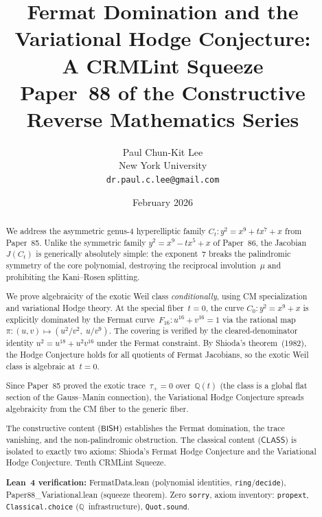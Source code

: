 \documentclass[11pt]{article}
\theoremstyle{plain}
\theoremstyle{definition}
\theoremstyle{remark}
\newcommand{\Q}{\mathbb{Q}}
\newcommand{\BISH}{\ensuremath{\mathsf{BISH}}}
\newcommand{\CLASS}{\ensuremath{\mathsf{CLASS}}}
\begin{document}
\title{%
  Fermat Domination and the Variational Hodge Conjecture:\\
  A CRMLint Squeeze\\[4pt]
  \large Paper~88 of the Constructive Reverse Mathematics Series}
\author{%
  Paul Chun-Kit Lee\\
  New York University\\
  \texttt{dr.paul.c.lee@gmail.com}}
\date{February 2026}
\maketitle

\begin{abstract}
We address the asymmetric genus-4 hyperelliptic family
$C_t\colon y^2 = x^9 + tx^7 + x$ from Paper~85.
Unlike the symmetric family $y^2 = x^9 - tx^5 + x$ of Paper~86,
the Jacobian~$J(C_t)$ is generically absolutely simple:
the exponent~$7$ breaks the palindromic symmetry of the core
polynomial, destroying the reciprocal involution~$\mu$ and
prohibiting the Kani--Rosen splitting.

We prove algebraicity of the exotic Weil class \emph{conditionally},
using CM specialization and variational Hodge theory.
At the special fiber~$t=0$, the curve
$C_0\colon y^2 = x^9 + x$ is explicitly dominated by the Fermat
curve~$F_{16}\colon u^{16} + v^{16} = 1$
via the rational map~$\pi\colon (u,v) \mapsto (u^2/v^2,\; u/v^9)$.
The covering is verified by the cleared-denominator identity
$u^2 = u^{18} + u^2 v^{16}$ under the Fermat constraint.
By Shioda's theorem~(1982), the Hodge Conjecture holds
for all quotients of Fermat Jacobians, so the exotic Weil class
is algebraic at~$t=0$.

Since Paper~85 proved the exotic trace~$\tau_+ = 0$ over~$\Q(t)$
(the class is a global flat section of the Gauss--Manin connection),
the Variational Hodge Conjecture spreads algebraicity from the
CM fiber to the generic fiber.

The constructive content (\BISH) establishes the Fermat domination,
the trace vanishing, and the non-palindromic obstruction.
The classical content (\CLASS) is isolated to exactly two axioms:
Shioda's Fermat Hodge Conjecture and the Variational Hodge
Conjecture.  Tenth CRMLint Squeeze.

\medskip\noindent
\textbf{Lean~4 verification:}
FermatData.lean (polynomial identities, \texttt{ring}/\texttt{decide}),
Paper88\_Variational.lean (squeeze theorem).
Zero \texttt{sorry}, axiom inventory:
\texttt{propext}, \texttt{Classical.choice} ($\Q$~infrastructure),
\texttt{Quot.sound}.
\end{abstract}
\end{document}
